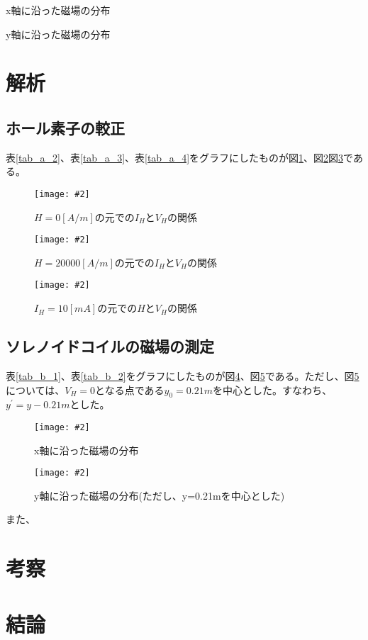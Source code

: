 \documentclass[uplatex,11pt]{jsarticle}
\newcommand{\cir}[3]{ %
    \begin{figure}
        \begin{center}
            \texttt{[image: \#2]}
            \caption{#3}
            \label{fg_#1}
         \end{center}
    \end{figure}
}
\newcommand{\tab}[4]{ %
    \begin{table}[htb]
        \centering
        \caption{#3}
        
        \label{tab_#1}
    \end{table}
}
\newcommand{\fr}[1]{図\ref{fg_#1}}
\newcommand{\tr}[1]{表\ref{tab_#1}}
\begin{document}
\tab{b_1}{./csv/jikken_b_1.csv}{x軸に沿った磁場の分布}{3}
\tab{b_2}{./csv/jikken_b_2.csv}{y軸に沿った磁場の分布}{3}

\section{解析}
\subsection{ホール素子の較正}

\tr{a_2}、\tr{a_3}、\tr{a_4}をグラフにしたものが\fr{a_2}、\fr{a_3}\fr{a_4}である。

\cir{a_2}{./graph/jikken_a_2.png}{ $ H=0[A/m] $の元での$I_H$と$V_H$の関係 }
\cir{a_3}{./graph/jikken_a_3.png}{ $ H=20000[A/m] $の元での$I_H$と$V_H$の関係 }
\cir{a_4}{./graph/jikken_a_4.png}{ $ I_H = 10[mA] $の元での$H$と$V_H$の関係 }

\subsection{ソレノイドコイルの磁場の測定}

\tr{b_1}、\tr{b_2}をグラフにしたものが\fr{b_1}、\fr{b_2}である。ただし、\fr{b_2}については、$V_H = 0$となる点である$y_0=0.21m$を中心とした。すなわち、$y^{\prime} = y - 0.21m$とした。

\cir{b_1}{./graph/jikken_b_1.png}{ x軸に沿った磁場の分布 }
\cir{b_2}{./graph/jikken_b_2.png}{ y軸に沿った磁場の分布(ただし、y=0.21mを中心とした) }

また、

\section{考察}
\section{結論}
\end{document}
